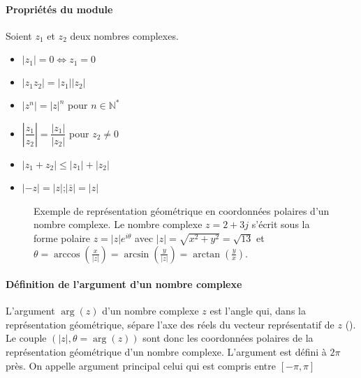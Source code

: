 \paragraph{Propriétés du module}
Soient $z_1$ et $z_2$ deux nombres complexes.
\begin{itemize}
    \item $|z_1|=0 \Leftrightarrow z_1=0$
    \item $|z_1z_2|=|z_1||z_2|$
    \item $|z^n|=|z|^n$ pour $n\in\mathbb{N}^*$
    \item $\left|\dfrac{z_1}{z_2}\right|=\dfrac{|z_1|}{|z_2|}$ pour $z_2\neq0$
    \item $|z_1+z_2|\le|z_1|+|z_2|$
    \item $|-z|=|z|$;$|\bar{z}|=|z|$
\end{itemize}
\begin{figure}[!h]
    \centering
    
    \caption{Exemple de représentation géométrique en coordonnées polaires 
             d'un nombre complexe. Le nombre complexe $z=2+3j$ s'écrit sous 
             la forme polaire $z=|z|e^{i\theta}$ avec 
             $|z|=\sqrt{x^2+y^2}=\sqrt{13}$ et 
             $\theta=\arccos{\left(\frac{x}{|z|}\right)}=
             \arcsin{\left(\frac{y}{|z|}\right)}=
             \arctan{\left(\frac{y}{x}\right)}$.\label{fig-plan_complexe2}}
\end{figure}
\paragraph{Définition de l'argument d'un nombre complexe}
L'argument $\arg{(z)}$ d'un nombre complexe $z$ est l'angle qui, dans la 
représentation géométrique, sépare l'axe des réels du vecteur représentatif de 
$z$ (). Le couple $(|z|,\theta=\arg{(z)})$ sont donc 
les coordonnées polaires de la représentation géométrique d'un nombre complexe.
L'argument est défini à $2\pi$ près. On appelle argument principal celui qui 
est compris entre $[-\pi,\pi]$
